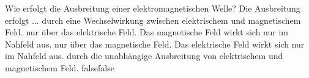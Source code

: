     {Wie erfolgt die Ausbreitung einer elektromagnetischen Welle? Die Ausbreitung erfolgt ...}
    {durch eine Wechselwirkung zwischen elektrischem und magnetischem Feld.}
    {nur über das elektrische Feld. Das magnetische Feld wirkt sich nur im Nahfeld aus.}
    {nur über das magnetische Feld. Das elektrische Feld wirkt sich nur im Nahfeld aus.}
    {durch die unabhängige Ausbreitung von elektrischem und magnetischem Feld.}
    {false}{false}